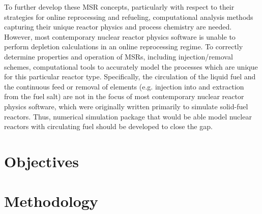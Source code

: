 To further develop these \gls{MSR} concepts, particularly with respect to their  
strategies for online reprocessing and refueling, computational analysis methods capturing their unique reactor physics and process chemistry are needed.
However, most contemporary nuclear reactor physics software is unable to 
perform depletion calculations in an online reprocessing regime. To correctly 
determine properties and operation of \glspl{MSR}, including injection/removal 
schemes, computational tools to accurately model the processes which are unique 
for this particular reactor type. Specifically, the circulation of the
liquid fuel and the continuous feed or removal of elements (e.g. injection into 
and extraction from the fuel salt) are not in the focus of most contemporary 
nuclear reactor physics software, which were originally written primarily to 
simulate solid-fuel reactors. Thus, numerical simulation package that would be 
able model nuclear reactors with circulating fuel should be developed to close 
the gap.

\section{Objectives}

\section{Methodology}